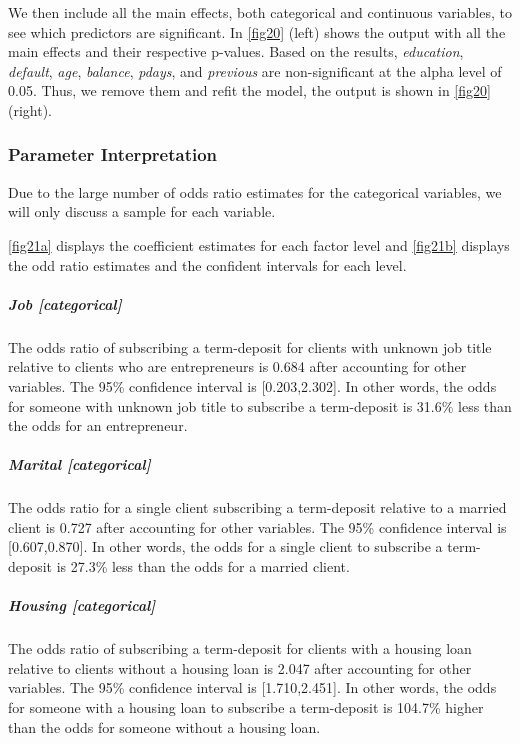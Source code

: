 \documentclass[]{article}
\let\oldsubparagraph\subparagraph
\renewcommand{\subparagraph}[1]{\oldsubparagraph{#1}\mbox{}}
\begin{document}
We then include all the main effects, both categorical and continuous
variables, to see which predictors are significant. In \autoref{fig20}
(left) shows the output with all the main effects and their respective
p-values. Based on the results, \emph{education}, \emph{default},
\emph{age}, \emph{balance}, \emph{pdays}, and \emph{previous} are
non-significant at the alpha level of 0.05. Thus, we remove them and
refit the model, the output is shown in \autoref{fig20} (right).

\subsubsection{Parameter Interpretation}\label{parameter-interpretation}

Due to the large number of odds ratio estimates for the categorical
variables, we will only discuss a sample for each variable.

\autoref{fig21a} displays the coefficient estimates for each factor
level and \autoref{fig21b} displays the odd ratio estimates and the
confident intervals for each level.

\subparagraph{Job {[}categorical{]}}\label{job-categorical}

The odds ratio of subscribing a term-deposit for clients with unknown
job title relative to clients who are entrepreneurs is 0.684 after
accounting for other variables. The 95\% confidence interval is
{[}0.203,2.302{]}. In other words, the odds for someone with unknown job
title to subscribe a term-deposit is 31.6\% less than the odds for an
entrepreneur.

\subparagraph{Marital {[}categorical{]}}\label{marital-categorical}

The odds ratio for a single client subscribing a term-deposit relative
to a married client is 0.727 after accounting for other variables. The
95\% confidence interval is {[}0.607,0.870{]}. In other words, the odds
for a single client to subscribe a term-deposit is 27.3\% less than the
odds for a married client.

\subparagraph{Housing {[}categorical{]}}\label{housing-categorical}

The odds ratio of subscribing a term-deposit for clients with a housing
loan relative to clients without a housing loan is 2.047 after
accounting for other variables. The 95\% confidence interval is
{[}1.710,2.451{]}. In other words, the odds for someone with a housing
loan to subscribe a term-deposit is 104.7\% higher than the odds for
someone without a housing loan.
\end{document}
